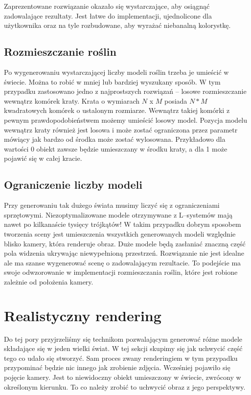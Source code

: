\documentclass[inz,shortabstract]{iithesis}
\begin{document}
        Zaprezentowane rozwiązanie okazało się wystarczające, aby osiągnąć zadowalające rezultaty. Jest łatwe do implementacji, ujednolicone dla użytkownika oraz na tyle rozbudowane, aby wyrażać niebanalną kolorystkę.
        
    \section{Rozmieszczanie roślin}
        Po wygenerowaniu wystarczającej liczby modeli roślin trzeba je umieścić w świecie. Można to robić w mniej lub bardziej wyszukany sposób. W tym przypadku zastosowano jedno z najprostszych rozwiązań -- losowe rozmieszczanie wewnątrz komórek kraty. Krata o wymiarach $N$ x $M$ posiada $N * M$ kwadratowych komórek o ustalonym rozmiarze. Wewnątrz takiej komórki z pewnym prawdopodobieństwem możemy umieścić losowy model. Pozycja modelu wewnątrz kraty również jest losowa i może zostać ograniczona przez parametr mówiący jak bardzo od środka może zostać wylosowana. Przykładowo dla wartości 0 obiekt zawsze będzie umieszczany w środku kraty, a dla 1 może pojawić się w całej kracie. 
        
    \section{Ograniczenie liczby modeli}
        Przy generowaniu tak dużego świata musimy liczyć się z ograniczeniami sprzętowymi. Niezoptymalizowane modele otrzymywane z L--systemów mają nawet po kilkanaście tysięcy trójkątów! W takim przypadku dobrym sposobem tworzenia sceny jest umieszczenia wszystkich generowanych modeli względnie blisko kamery, która renderuje obraz. Duże modele będą zasłaniać znaczną część pola widzenia ukrywając niewypełnioną przestrzeń. Rozwiązanie nie jest idealne ale ma szanse wygenerować scenę o zadowalającym rezultacie. To podejście ma swoje odwzorowanie w implementacji rozmieszczania roślin, które jest robione zależnie od położenia kamery.
        
\chapter{Realistyczny rendering}
    Do tej pory przyjrzeliśmy się technikom pozwalającym generować różne modele składające się w jeden wielki świat. W tej sekcji skupimy się jak uchwycić część tego co udało się stworzyć. Sam proces zwany renderingiem w tym przypadku przypominać będzie nic innego jak zrobienie zdjęcia. Wcześniej pojawiło się pojęcie kamery. Jest to niewidoczny obiekt umieszczony w świecie, zwrócony w określonym kierunku. To co należy zrobić to uchwycić obraz z jego perspektywy. 
    
\end{document}
